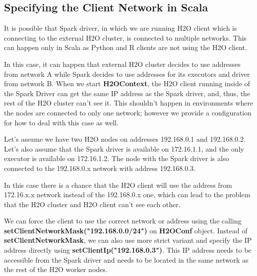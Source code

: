 \subsection{Specifying the Client Network in Scala}
\label{specify_ip}

It is possible that Spark driver, in which we are running H2O client which is connecting to the external H2O cluster, is
connected to multiple networks. This can happen only in Scala as Python and R clients are not using the H2O client.

In this case, it can happen that external H2O cluster decides to use addresses from network A while Spark decides to use
addresses for its executors and driver from network B. When we start \textbf{H2OContext}, the H2O
client running inside of the Spark Driver can get the same IP address as the Spark driver, and, thus, the rest
of the H2O cluster can't see it. This shouldn't happen in environments where the nodes are connected to only one
network; however we provide a configuration for how to deal with this case as well.

Let's assume we have two H2O nodes on addresses 192.168.0.1 and 192.168.0.2. Let's also assume that the Spark driver
is available on 172.16.1.1, and the only executor is available on 172.16.1.2. The node with the Spark driver
is also connected to the 192.168.0.x network with address 192.168.0.3.

In this case there is a chance that the H2O client will use the address from 172.16.x.x network instead
of the 192.168.0.x one, which can lead to the problem that the H2O cluster and H2O client can't see each other.

We can force the client to use the correct network or address using the calling \textbf{setClientNetworkMask("192.168.0.0/24")}
on \textbf{H2OConf} object. Instead of \textbf{setClientNetworkMask}, we can also use more strict variant and specify
the IP address directly using \textbf{setClientIp("192.168.0.3")}. This IP address needs to be accessible from the
Spark driver and needs to be located in the same network as the rest of the H2O worker nodes.
